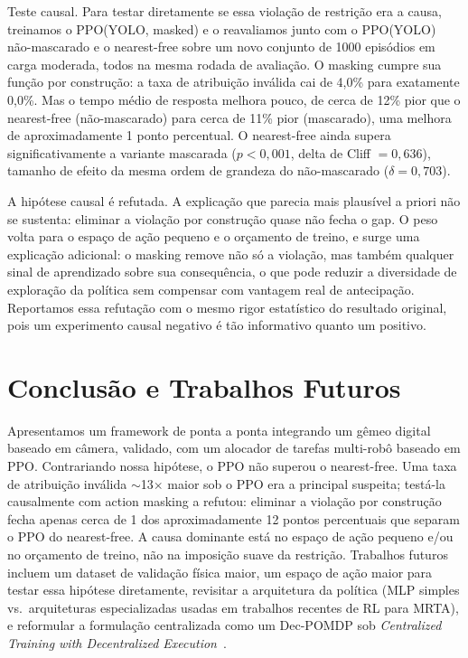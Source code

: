 \documentclass[conference]{IEEEtran}
\begin{document}
Teste causal. Para testar diretamente se essa violação de restrição era a causa, treinamos o PPO(YOLO, masked) e o reavaliamos junto com o PPO(YOLO) não-mascarado e o nearest-free sobre um novo conjunto de 1000 episódios em carga moderada, todos na mesma rodada de avaliação. O masking cumpre sua função por construção: a taxa de atribuição inválida cai de 4,0\% para exatamente 0,0\%. Mas o tempo médio de resposta melhora pouco, de cerca de 12\% pior que o nearest-free (não-mascarado) para cerca de 11\% pior (mascarado), uma melhora de aproximadamente 1 ponto percentual. O nearest-free ainda supera significativamente a variante mascarada ($p<0,001$, delta de Cliff $=0,636$), tamanho de efeito da mesma ordem de grandeza do não-mascarado ($\delta=0,703$).

A hipótese causal é refutada. A explicação que parecia mais plausível a priori não se sustenta: eliminar a violação por construção quase não fecha o gap. O peso volta para o espaço de ação pequeno e o orçamento de treino, e surge uma explicação adicional: o masking remove não só a violação, mas também qualquer sinal de aprendizado sobre sua consequência, o que pode reduzir a diversidade de exploração da política sem compensar com vantagem real de antecipação. Reportamos essa refutação com o mesmo rigor estatístico do resultado original, pois um experimento causal negativo é tão informativo quanto um positivo.

\section{Conclusão e Trabalhos Futuros}

Apresentamos um framework de ponta a ponta integrando um gêmeo digital baseado em câmera, validado, com um alocador de tarefas multi-robô baseado em PPO. Contrariando nossa hipótese, o PPO não superou o nearest-free. Uma taxa de atribuição inválida $\sim$13$\times$ maior sob o PPO era a principal suspeita; testá-la causalmente com action masking a refutou: eliminar a violação por construção fecha apenas cerca de 1 dos aproximadamente 12 pontos percentuais que separam o PPO do nearest-free. A causa dominante está no espaço de ação pequeno e/ou no orçamento de treino, não na imposição suave da restrição. Trabalhos futuros incluem um dataset de validação física maior, um espaço de ação maior para testar essa hipótese diretamente, revisitar a arquitetura da política (MLP simples vs.\ arquiteturas especializadas usadas em trabalhos recentes de RL para MRTA), e reformular a formulação centralizada como um Dec-POMDP sob \textit{Centralized Training with Decentralized Execution}~\cite{lowe2017multi}.
\end{document}
